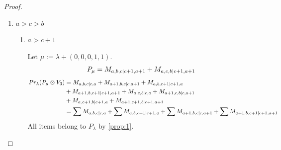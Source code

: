 \begin{proof}
\begin{enumerate}
  \item $a>c>b$ 
    \begin{enumerate}
      \item $a>c+1$\par
        Let $\mu:=\lambda + (0,0,0,1,1) $.
        \begin{equation}\notag
          \begin{aligned}
            P_\mu = M_{a,b,c|c+1,a+1}
+ M_{a,c,b|c+1,a+1}
          \end{aligned}
        \end{equation}
        \begin{equation}\notag
          \begin{aligned}
            Pr_{\lambda}(P_\mu \otimes V_{3}) &=
M_{a,b,c|c,a}
+ M_{a+1,b,c|c,a+1}
+ M_{a,b,c+1|c+1,a}\\ 
                                              &
+ M_{a+1,b,c+1|c+1,a+1}
+ M_{a,c,b|c,a}
+ M_{a+1,c,b|c,a+1}\\ 
                                              &
+ M_{a,c+1,b|c+1,a}
+ M_{a+1,c+1,b|c+1,a+1} \\
                                               &=
\sum M_{a,b,c|c,a}
+ \sum M_{a,b,c+1|c+1,a}
+ \sum M_{a+1,b,c|c,a+1}
+ \sum M_{a+1,b,c+1|c+1,a+1}
          \end{aligned}
        \end{equation}
All items belong to $P_\lambda$ by \cref{prop:1}.



\end{enumerate}
\end{enumerate}
\end{proof}
